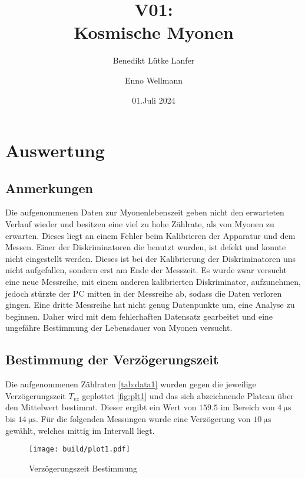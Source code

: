 

\title{V01:\\ Kosmische Myonen}
\author{Benedikt Lütke Lanfer \and Enno Wellmann}
\date{01.Juli 2024}
\publishers{TU Dortmund – Fakultät Physik}



\tableofcontents
\newpage



\section{Auswertung}
\subsection{Anmerkungen}
Die aufgenommenen Daten zur Myonenlebenszeit geben nicht den erwarteten Verlauf wieder und besitzen eine viel zu hohe Zählrate, als von Myonen zu erwarten.
Dieses liegt an einem Fehler beim Kalibrieren der Apparatur und dem Messen. 
Einer der Diskriminatoren die benutzt wurden, ist defekt und konnte nicht eingestellt werden. 
Dieses ist bei der Kalibrierung der Diskriminatoren uns nicht aufgefallen, sondern erst am Ende der Messzeit. 
Es wurde zwar versucht eine neue Messreihe, mit einem anderen kalibrierten Diskriminator, aufzunehmen, 
jedoch stürzte der PC mitten in der Messreihe ab, sodass die Daten verloren gingen. 
Eine dritte Messreihe hat nicht genug Datenpunkte um, eine Analyse zu beginnen. 
Daher wird mit dem fehlerhaften Datensatz gearbeitet und eine ungefähre Bestimmung der Lebensdauer von Myonen versucht.    

\subsection{Bestimmung der Verzögerungszeit}
Die aufgenommenen Zählraten \eqref{tab:data1} wurden gegen die jeweilige Verzögerungszeit $T_{vz}$ geplottet \eqref{fig:plt1} 
und das sich abzeichnende Plateau über den Mittelwert bestimmt. Dieser ergibt ein Wert von $\num{159.5}$ im Bereich von $\qty{4}{\us}$ bis $\qty{14}{\us}$.
Für die folgenden Messungen wurde eine Verzögerung von $\qty{10}{\us}$ gewählt, welches mittig im Intervall liegt. 

\begin{figure}[H]
	\centering
	\texttt{[image: build/plot1.pdf]}
	\caption{Verzögerungszeit Bestimmung}\label{fig:plt1}
\end{figure}

